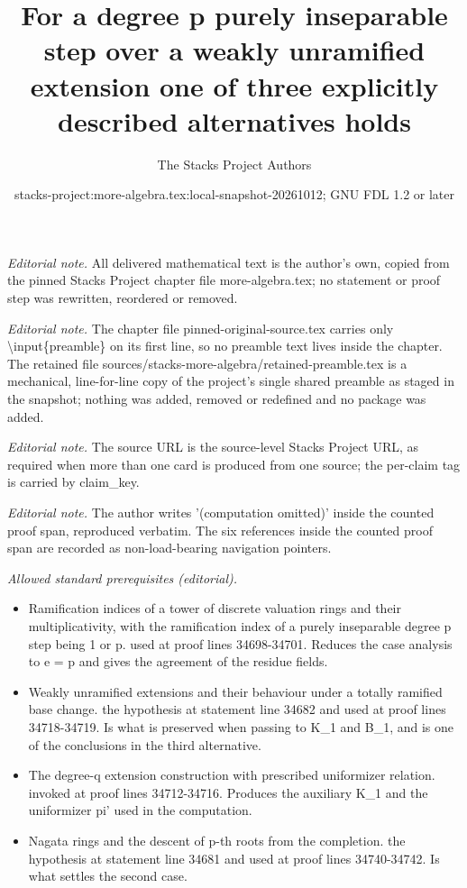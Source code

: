 \documentclass[10pt,a4paper]{amsart}
\title{For a degree p purely inseparable step over a weakly unramified extension one of three explicitly described alternatives holds}
\author{The Stacks Project Authors}
\date{stacks-project:more-algebra.tex:local-snapshot-20261012; GNU FDL 1.2 or later}
\theoremstyle{plain}
\theoremstyle{definition}
\theoremstyle{remark}
\numberwithin{equation}{subsection}
\begin{document}
\maketitle
\setcounter{subsection}{1}
\noindent\textit{Editorial note.} All delivered mathematical text is the author's own, copied from the pinned Stacks Project chapter file more-algebra.tex; no statement or proof step was rewritten, reordered or removed.\par\medskip
\noindent\textit{Editorial note.} The chapter file pinned-original-source.tex carries only \textbackslash{}input\{preamble\} on its first line, so no preamble text lives inside the chapter. The retained file sources/stacks-more-algebra/retained-preamble.tex is a mechanical, line-for-line copy of the project's single shared preamble as staged in the snapshot; nothing was added, removed or redefined and no package was added.\par\medskip
\noindent\textit{Editorial note.} The source URL is the source-level Stacks Project URL, as required when more than one card is produced from one source; the per-claim tag is carried by claim\_key.\par\medskip
\noindent\textit{Editorial note.} The author writes '(computation omitted)' inside the counted proof span, reproduced verbatim. The six references inside the counted proof span are recorded as non-load-bearing navigation pointers.\par\medskip
\noindent\textit{Allowed standard prerequisites (editorial).}\begin{itemize}
\item Ramification indices of a tower of discrete valuation rings and their multiplicativity, with the ramification index of a purely inseparable degree p step being 1 or p. used at proof lines 34698-34701. Reduces the case analysis to e = p and gives the agreement of the residue fields.
\item Weakly unramified extensions and their behaviour under a totally ramified base change. the hypothesis at statement line 34682 and used at proof lines 34718-34719. Is what is preserved when passing to K\_1 and B\_1, and is one of the conclusions in the third alternative.
\item The degree-q extension construction with prescribed uniformizer relation. invoked at proof lines 34712-34716. Produces the auxiliary K\_1 and the uniformizer pi' used in the computation.
\item Nagata rings and the descent of p-th roots from the completion. the hypothesis at statement line 34681 and used at proof lines 34740-34742. Is what settles the second case.
\end{itemize}\medskip
\end{document}
